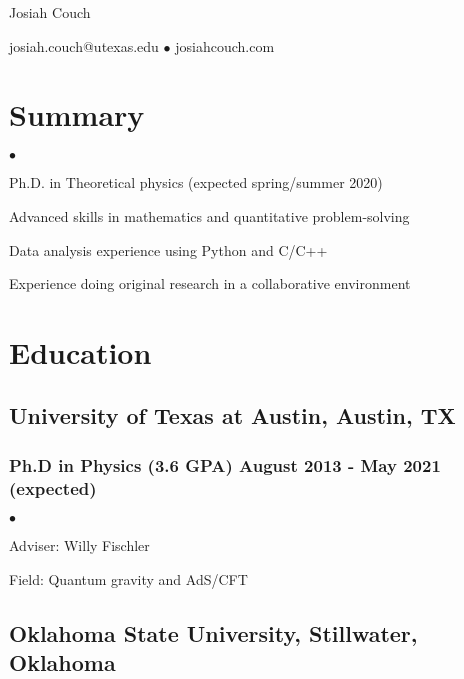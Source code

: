 \documentclass[letterpaper]{article}
\def\name{Josiah Couch}
\renewenvironment{itemize}{
  \begin{list}{$\bullet$}{
    \setlength{\itemsep}{0em}
    \setlength{\parskip}{0em}
    \setlength{\parsep}{0em} 
    \setlength{\topsep}{0em} 
  }
}{
  \end{list}
}
\begin{document}

\centerline{\LARGE \name}

\begin{center}

\small{josiah.couch@utexas.edu $\bullet$ josiahcouch.com}

\end{center}

\section*{Summary}

\begin{itemize}

\item Ph.D. in Theoretical physics (expected spring/summer 2020)

\item Advanced skills in mathematics and quantitative problem-solving

\item Data analysis experience using Python and C/C++

\item Experience doing original research in a collaborative environment

\end{itemize}

\section*{Education}

\subsection*{University of Texas at Austin, Austin, TX}
\subsubsection*{Ph.D in Physics (3.6 GPA) \hfill August 2013 - May 2021 (expected)}

\begin{itemize}
\item Adviser: Willy Fischler
\item Field: Quantum gravity and AdS/CFT
\end{itemize}

\subsection*{Oklahoma State University, Stillwater, Oklahoma}
\end{document}

